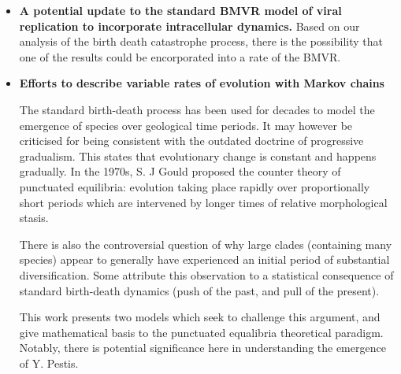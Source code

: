\begin{itemize}
\item \textbf{A potential update to the standard BMVR model of viral replication to incorporate intracellular dynamics.}
Based on our analysis of the birth death catastrophe process, there is the possibility that one of the results could be encorporated into a rate of the BMVR.

\item \textbf{Efforts to describe variable rates of evolution with Markov chains}\par
The standard birth-death process has been used for decades to model the emergence of species over geological time periods. It may however be criticised for being consistent with the outdated doctrine of progressive gradualism. This states that evolutionary change is constant and happens gradually. In the 1970s,  S. J Gould proposed the counter theory of punctuated equilibria: evolution taking place rapidly over proportionally short periods which are intervened by longer times of relative morphological stasis.\par
There is also the controversial question of why large clades (containing many species) appear to generally have experienced an initial period of substantial diversification. Some attribute this observation to a statistical consequence of standard birth-death dynamics (push of the past, and pull of the present).\par
This work presents two models which seek to challenge this argument, and give mathematical basis to the punctuated equalibria theoretical paradigm. Notably, there is potential significance here in understanding the emergence of Y. Pestis.


\end{itemize}
